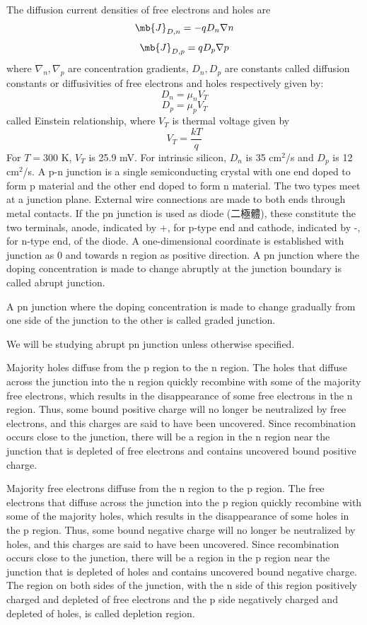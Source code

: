 \documentclass[a4paper,12pt]{article}
\begin{document}
The diffusion current densities of free electrons and holes are
\[\mb{J}_{D,n}=-qD_n\nabla n\]
\[\mb{J}_{D,p}=qD_p\nabla p\]
where $\nabla_n,\nabla_p$ are concentration gradients, $D_n,D_p$ are constants called diffusion constants or diffusivities of free electrons and holes respectively given by:
\[D_n=\mu_nV_T\]
\[D_p=\mu_pV_T\]
called Einstein relationship, where $V_T$ is thermal voltage given by
\[V_T=\frac{kT}{q}\]
For $T=300$ K, $V_T$ is 25.9 mV. For intrinsic silicon, $D_n$ is 35 cm$^2$/s and $D_p$ is 12 cm$^2$/s.
A p-n junction is a single semiconducting crystal with one end doped to form p material and the other end doped to form n material. The two types meet at a junction plane. External wire connections are made to both ends through metal contacts. If the pn junction is used as diode (二極體), these constitute the two terminals, anode, indicated by +, for p-type end and cathode, indicated by -, for n-type end, of the diode. A one-dimensional coordinate is established with junction as 0 and towards n region as positive direction.
A pn junction where the doping concentration is made to change abruptly at the junction boundary is called abrupt junction.

A pn junction where the doping concentration is made to change gradually from one side of the junction to the other is called graded junction.

We will be studying abrupt pn junction unless otherwise specified.
\bit
\item Majority holes diffuse from the p region to the n region. The holes that diffuse across the junction into the n region quickly recombine with some of the majority free electrons, which results in the disappearance of some free electrons in the n region. Thus, some bound positive charge will no longer be neutralized by free electrons, and this charges are said to have been uncovered. Since recombination occurs close to the junction, there will be a region in the n region near the junction that is depleted of free electrons and contains uncovered bound positive charge.
\item Majority free electrons diffuse from the n region to the p region. The free electrons that diffuse across the junction into the p region quickly recombine with some of the majority holes, which results in the disappearance of some holes in the p region. Thus, some bound negative charge will no longer be neutralized by holes, and this charges are said to have been uncovered. Since recombination occurs close to the junction, there will be a region in the p region near the junction that is depleted of holes and contains uncovered bound negative charge.
\eit
The region on both sides of the junction, with the n side of this region positively charged and depleted of free electrons and the p side negatively charged and depleted of holes, is called depletion region.
\end{document}
